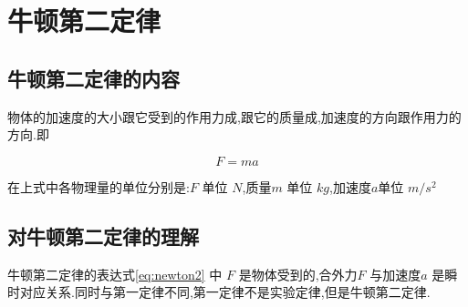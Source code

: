 \section{牛顿第二定律}
\subsection{牛顿第二定律的内容}
物体的加速度的大小跟它受到的作用力成,跟它的质量成,加速度的方向跟作用力的方向.即

\begin{equation}
  F=ma
  \label{eq:newton2}
\end{equation}

在上式中各物理量的单位分别是:$F$ 单位 $N$,质量$m$ 单位 $kg$,加速度$a$单位 $m/s^2$

\subsection{对牛顿第二定律的理解}
牛顿第二定律的表达式\eqref{eq:newton2} 中 $F$ 是物体受到的,合外力$F$ 与加速度$a$ 是瞬时对应关系.同时与第一定律不同,第一定律不是实验定律,但是牛顿第二定律.

